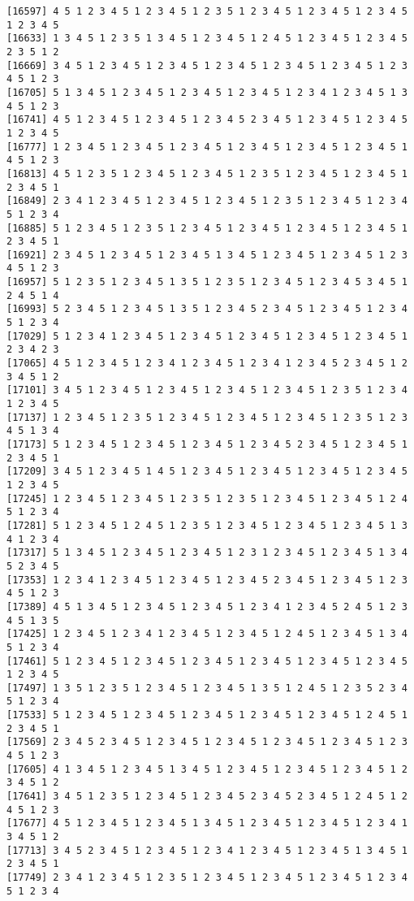 \documentclass[
  11pt,
]{book}
\begin{document}
\begin{verbatim}
[16597] 4 5 1 2 3 4 5 1 2 3 4 5 1 2 3 5 1 2 3 4 5 1 2 3 4 5 1 2 3 4 5 1 2 3 4 5
[16633] 1 3 4 5 1 2 3 5 1 3 4 5 1 2 3 4 5 1 2 4 5 1 2 3 4 5 1 2 3 4 5 2 3 5 1 2
[16669] 3 4 5 1 2 3 4 5 1 2 3 4 5 1 2 3 4 5 1 2 3 4 5 1 2 3 4 5 1 2 3 4 5 1 2 3
[16705] 5 1 3 4 5 1 2 3 4 5 1 2 3 4 5 1 2 3 4 5 1 2 3 4 1 2 3 4 5 1 3 4 5 1 2 3
[16741] 4 5 1 2 3 4 5 1 2 3 4 5 1 2 3 4 5 2 3 4 5 1 2 3 4 5 1 2 3 4 5 1 2 3 4 5
[16777] 1 2 3 4 5 1 2 3 4 5 1 2 3 4 5 1 2 3 4 5 1 2 3 4 5 1 2 3 4 5 1 4 5 1 2 3
[16813] 4 5 1 2 3 5 1 2 3 4 5 1 2 3 4 5 1 2 3 5 1 2 3 4 5 1 2 3 4 5 1 2 3 4 5 1
[16849] 2 3 4 1 2 3 4 5 1 2 3 4 5 1 2 3 4 5 1 2 3 5 1 2 3 4 5 1 2 3 4 5 1 2 3 4
[16885] 5 1 2 3 4 5 1 2 3 5 1 2 3 4 5 1 2 3 4 5 1 2 3 4 5 1 2 3 4 5 1 2 3 4 5 1
[16921] 2 3 4 5 1 2 3 4 5 1 2 3 4 5 1 3 4 5 1 2 3 4 5 1 2 3 4 5 1 2 3 4 5 1 2 3
[16957] 5 1 2 3 5 1 2 3 4 5 1 3 5 1 2 3 5 1 2 3 4 5 1 2 3 4 5 3 4 5 1 2 4 5 1 4
[16993] 5 2 3 4 5 1 2 3 4 5 1 3 5 1 2 3 4 5 2 3 4 5 1 2 3 4 5 1 2 3 4 5 1 2 3 4
[17029] 5 1 2 3 4 1 2 3 4 5 1 2 3 4 5 1 2 3 4 5 1 2 3 4 5 1 2 3 4 5 1 2 3 4 2 3
[17065] 4 5 1 2 3 4 5 1 2 3 4 1 2 3 4 5 1 2 3 4 1 2 3 4 5 2 3 4 5 1 2 3 4 5 1 2
[17101] 3 4 5 1 2 3 4 5 1 2 3 4 5 1 2 3 4 5 1 2 3 4 5 1 2 3 5 1 2 3 4 1 2 3 4 5
[17137] 1 2 3 4 5 1 2 3 5 1 2 3 4 5 1 2 3 4 5 1 2 3 4 5 1 2 3 5 1 2 3 4 5 1 3 4
[17173] 5 1 2 3 4 5 1 2 3 4 5 1 2 3 4 5 1 2 3 4 5 2 3 4 5 1 2 3 4 5 1 2 3 4 5 1
[17209] 3 4 5 1 2 3 4 5 1 4 5 1 2 3 4 5 1 2 3 4 5 1 2 3 4 5 1 2 3 4 5 1 2 3 4 5
[17245] 1 2 3 4 5 1 2 3 4 5 1 2 3 5 1 2 3 5 1 2 3 4 5 1 2 3 4 5 1 2 4 5 1 2 3 4
[17281] 5 1 2 3 4 5 1 2 4 5 1 2 3 5 1 2 3 4 5 1 2 3 4 5 1 2 3 4 5 1 3 4 1 2 3 4
[17317] 5 1 3 4 5 1 2 3 4 5 1 2 3 4 5 1 2 3 1 2 3 4 5 1 2 3 4 5 1 3 4 5 2 3 4 5
[17353] 1 2 3 4 1 2 3 4 5 1 2 3 4 5 1 2 3 4 5 2 3 4 5 1 2 3 4 5 1 2 3 4 5 1 2 3
[17389] 4 5 1 3 4 5 1 2 3 4 5 1 2 3 4 5 1 2 3 4 1 2 3 4 5 2 4 5 1 2 3 4 5 1 3 5
[17425] 1 2 3 4 5 1 2 3 4 1 2 3 4 5 1 2 3 4 5 1 2 4 5 1 2 3 4 5 1 3 4 5 1 2 3 4
[17461] 5 1 2 3 4 5 1 2 3 4 5 1 2 3 4 5 1 2 3 4 5 1 2 3 4 5 1 2 3 4 5 1 2 3 4 5
[17497] 1 3 5 1 2 3 5 1 2 3 4 5 1 2 3 4 5 1 3 5 1 2 4 5 1 2 3 5 2 3 4 5 1 2 3 4
[17533] 5 1 2 3 4 5 1 2 3 4 5 1 2 3 4 5 1 2 3 4 5 1 2 3 4 5 1 2 4 5 1 2 3 4 5 1
[17569] 2 3 4 5 2 3 4 5 1 2 3 4 5 1 2 3 4 5 1 2 3 4 5 1 2 3 4 5 1 2 3 4 5 1 2 3
[17605] 4 1 3 4 5 1 2 3 4 5 1 3 4 5 1 2 3 4 5 1 2 3 4 5 1 2 3 4 5 1 2 3 4 5 1 2
[17641] 3 4 5 1 2 3 5 1 2 3 4 5 1 2 3 4 5 2 3 4 5 2 3 4 5 1 2 4 5 1 2 4 5 1 2 3
[17677] 4 5 1 2 3 4 5 1 2 3 4 5 1 3 4 5 1 2 3 4 5 1 2 3 4 5 1 2 3 4 1 3 4 5 1 2
[17713] 3 4 5 2 3 4 5 1 2 3 4 5 1 2 3 4 1 2 3 4 5 1 2 3 4 5 1 3 4 5 1 2 3 4 5 1
[17749] 2 3 4 1 2 3 4 5 1 2 3 5 1 2 3 4 5 1 2 3 4 5 1 2 3 4 5 1 2 3 4 5 1 2 3 4

\end{verbatim}
\end{document}
